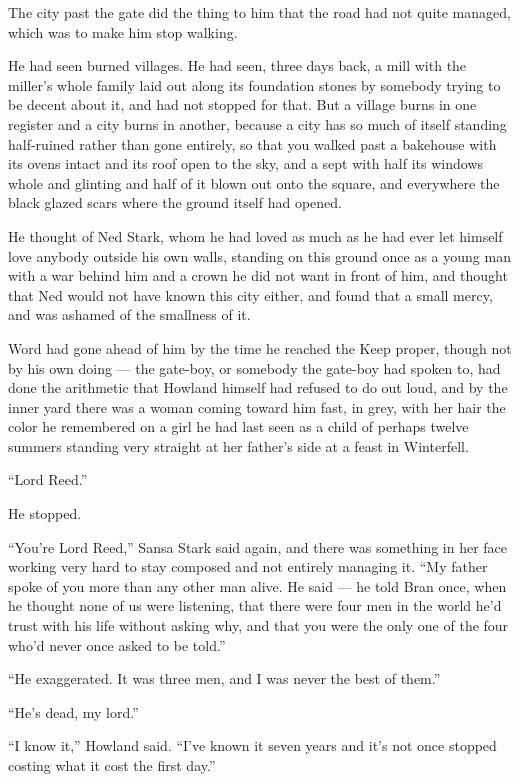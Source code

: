 \sceneBreak

The city past the gate did the thing to him that the road had not quite managed, which was to make him stop walking.

He had seen burned villages. He had seen, three days back, a mill with the miller’s whole family laid out along its foundation stones by somebody trying to be decent about it, and had not stopped for that. But a village burns in one register and a city burns in another, because a city has so much of itself standing half-ruined rather than gone entirely, so that you walked past a bakehouse with its ovens intact and its roof open to the sky, and a sept with half its windows whole and glinting and half of it blown out onto the square, and everywhere the black glazed scars where the ground itself had opened.

He thought of Ned Stark, whom he had loved as much as he had ever let himself love anybody outside his own walls, standing on this ground once as a young man with a war behind him and a crown he did not want in front of him, and thought that Ned would not have known this city either, and found that a small mercy, and was ashamed of the smallness of it.

\sceneBreak

Word had gone ahead of him by the time he reached the Keep proper, though not by his own doing — the gate-boy, or somebody the gate-boy had spoken to, had done the arithmetic that Howland himself had refused to do out loud, and by the inner yard there was a woman coming toward him fast, in grey, with her hair the color he remembered on a girl he had last seen as a child of perhaps twelve summers standing very straight at her father’s side at a feast in Winterfell.

“Lord Reed.”

He stopped.

“You’re Lord Reed,” Sansa Stark said again, and there was something in her face working very hard to stay composed and not entirely managing it. “My father spoke of you more than any other man alive. He said — he told Bran once, when he thought none of us were listening, that there were four men in the world he’d trust with his life without asking why, and that you were the only one of the four who’d never once asked to be told.”

“He exaggerated. It was three men, and I was never the best of them.”

“He’s dead, my lord.”

“I know it,” Howland said. “I’ve known it seven years and it’s not once stopped costing what it cost the first day.”

